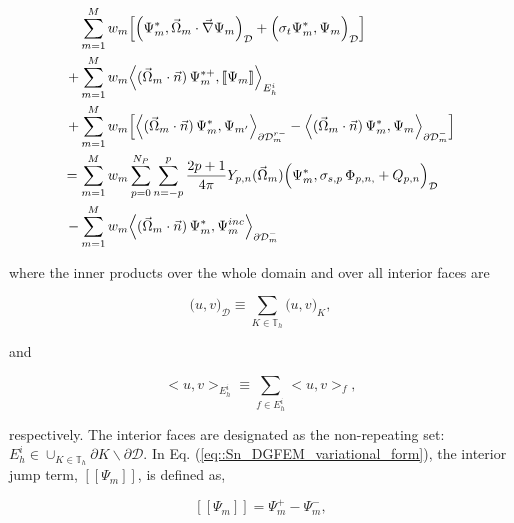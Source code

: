 \begin{equation}
\label{eq::Sn_DGFEM_variational_form}
\begin{aligned}
\sum\displaylimits_{m=1}^M w_m& \Big[  \Big(  \Psi_m^*, \vec{\Omega}_m \cdot   \vec{\nabla} \Psi_{m} \Big)_{\mathcal{D}} + \Big( \sigma_t  \Psi_m^{*},  \Psi_{m} \Big)_{\mathcal{D}}  \Big]  \\
+ \sum\displaylimits_{m=1}^M w_m& \Big< ( \vec{\Omega}_m \cdot \vec{n} ) \, \Psi_m^{* +}, [\![ \Psi_m]\!]  \Big>_{E_h^i} \\
+ \sum\displaylimits_{m=1}^M w_m& \Big[ \Big< ( \vec{\Omega}_m \cdot \vec{n} ) \, \Psi_m^{*}, {\Psi}_{m'}  \Big>_{\partial \mathcal{D}_m^{r-}} -  \Big< ( \vec{\Omega}_m \cdot \vec{n} ) \, \Psi_m^{*}, {\Psi}_m  \Big>_{\partial \mathcal{D}_m^-}   \Big] \\
= \sum\displaylimits_{m=1}^M w_m&     \sum_{p=0}^{N_P} \sum_{n=-p}^{p} \frac{2p + 1}{4 \pi}  Y_{p,n} (  \vec{\Omega}_m )  \Big(   \Psi_m^{*}, \sigma_{s,p} \,  \Phi_{p,n,} +  Q_{p,n} \Big)_{\mathcal{D}}  \\
- \sum\displaylimits_{m=1}^M w_m&   \Big< ( \vec{\Omega}_m \cdot \vec{n} ) \, \Psi_m^{*}, {\Psi}_m^{inc}  \Big>_{\partial \mathcal{D}_m^- }
\end{aligned}
\end{equation}

\noindent where the inner products over the whole domain and over all interior faces are

\begin{equation}
\label{eq::Sn_DGFEM_vol_inner_prod}
\Big( u, v \Big)_{\mathcal{D}} \equiv \sum_{K \in \mathbb{T}_h}  \Big( u, v \Big)_{K} ,
\end{equation}

\noindent and 

\begin{equation}
\label{eq::Sn_DGFEM_surf_inner_prod}
\Big< u, v \Big>_{E_h^i} \equiv \sum_{f \in E_h^i}  \Big< u, v \Big>_{f} ,
\end{equation}

\noindent respectively. The interior faces are designated as the non-repeating set: $E_h^i \in \cup_{K \in  \mathbb{T}_h} \partial K \backslash \partial \mathcal{D}$. In Eq. (\ref{eq::Sn_DGFEM_variational_form}), the interior jump term, $[\![ \Psi_m]\!]$, is defined as,

\begin{equation}
\label{eq::Sn_Spatial_Convergence_jump}
[\![ \Psi_m]\!] = \Psi_m^{+} - \Psi_m^{-} ,
\end{equation}

